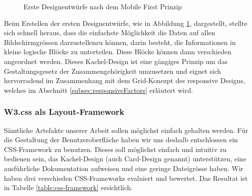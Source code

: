 \begin{figure}[h!]
	\centering
	\caption{Erste Designentwürfe nach dem Mobile First Prinzip}
	\label{img:scribbles}
\end{figure}

Beim Erstellen der ersten Designentwürfe, wie in Abbildung \ref{img:scribbles}, dargestellt, stellte sich schnell heraus, dass die einfachste Möglichkeit die Daten auf allen Bildschirmgrössen darzustellenzu können, darin besteht, die Informationen in kleine logische Blöcke zu unterteilen. Diese Blöcke können dann verschieden angeordnet werden. Dieses Kachel-Design ist eine gängiges Prinzip um das Gestaltungsgesetz der Zusammengehörigkeit umzusetzen und eignet sich hervorradend im Zusammenhang mit dem Grid-Konezpt des responsive Designs, welches im Abschnitt \ref{subsec:responsiveFactors} erläutert wird.


\subsubsection{W3.css als Layout-Framework}
Sämtliche Artefakte unserer Arbeit sollen möglichst einfach gehalten werden. Für die Gestaltung der Benutzeroberfläche haben wir uns deshalb entschlossen ein CSS-Framework zu benutzen. Dieses soll möglichst einfach und intuitiv zu bedienen sein, das Kachel-Design (auch Card-Design genannt) unterstützen, eine ausführliche Dokumentation aufweisen und eine geringe Dateigrösse haben. Wir haben drei verschieden CSS-Frameworks evaluiert und bewertet. Das Resultat ist in Tabelle  \ref{table:css-framework} ersichtlich.

